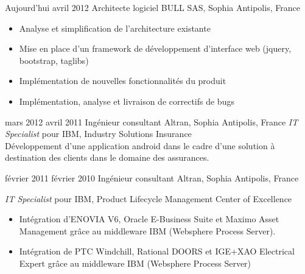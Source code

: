 \documentclass[print]{roger-cv}
\begin{document}
\begin{entrylist}
  \entry
    {Aujourd'hui}
    {avril 2012}
    {Architecte logiciel}
    {BULL SAS, Sophia Antipolis, France}  
    {
      \vspace{-3mm}
      \begin{itemize}
        \item{Analyse et simplification de l'architecture existante}
        \item{Mise en place d'un framework de développement d'interface web (jquery, bootstrap, taglibs)}
        \item{Implémentation de nouvelles fonctionnalités du produit}
        \item{Implémentation, analyse et livraison de correctifs de bugs}
       \end{itemize}
    }

  \entry
    {mars 2012}
    {avril 2011}
    {Ingénieur consultant}
    {Altran, Sophia Antipolis, France}  
    {
      \emph{IT Specialist} pour IBM, Industry Solutions Insurance\\ 
      Développement d'une application android dans le cadre d'une solution à destination 
      des clients dans le domaine des assurances.
    }

  \entry
    {février 2011}
    {février 2010}
    {Ingénieur consultant}
    {Altran, Sophia Antipolis, France}  
    {
      \emph{IT Specialist} pour IBM, Product Lifecycle Management Center of Excellence\\
      \vspace{-3mm}
        \begin{itemize}
           \item Intégration d'ENOVIA V6, Oracle E-Business Suite et Maximo Asset Management grâce au middleware IBM (Websphere Process Server).
 	\item Intégration de PTC Windchill, Rational DOORS et IGE+XAO Electrical Expert grâce au middleware IBM (Websphere Process Server)
         \end{itemize}
    }


\end{entrylist}
\end{document}

